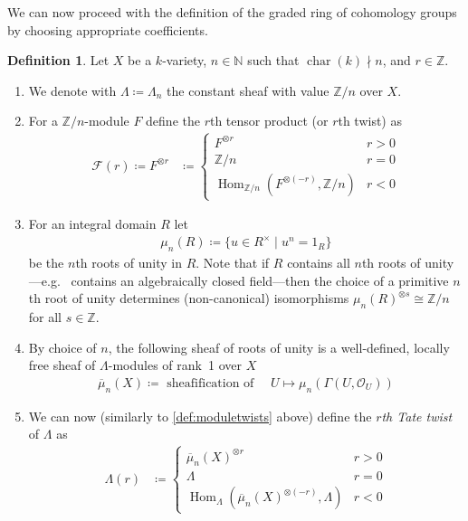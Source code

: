 \documentclass[english,headsepline=0.25pt]{scrartcl}
\theoremstyle{definition}
\newtheorem{Def}{Definition}[section]
\theoremstyle{remark}
\newcommand*{\N}{\mathds{N}}
\newcommand*{\Z}{\mathds{Z}}
\newcommand*{\Zmod}[1]{\Z/#1} %
\newcommand*{\F}{\mathcal{F}} %
\DeclareMathOperator{\Char}{char} %
\DeclareMathOperator{\Hom}{Hom} %
\newcommand*{\forexample}{e.g.\ }
\begin{document}
We can now proceed with the definition of the graded ring of
cohomology groups by choosing appropriate coefficients.
\begin{Def}\label{def:coefficients}
  Let $X$ be a $k$-variety,
  $n\in\N$ such that $\Char(k)\nmid n$,
  and $r\in\Z$.
  \begin{enumerate}
  \item We denote with $\Lambda\coloneqq\Lambda_n$ the constant sheaf
    with value $\Zmod{n}$ over $X$.
  \item\label{def:moduletwists}
    For a $\Zmod{n}$-module $F$ define the $r$th tensor product
    (or $r$th twist) as
    \begin{align*}
      \F(r)\coloneqq F^{\otimes r}
      &\coloneqq \begin{cases}
        F^{\otimes r} &r>0\\
        \Zmod{n} &r=0\\
        \Hom_{\Zmod{n}}(F^{\otimes (-r)},\Zmod{n}) &r<0
      \end{cases}
    \end{align*}
  \item\label{def:rootsofunity} For an integral domain $R$ let
    \begin{gather*}
      \mu_n(R)\coloneqq\{ u\in R^\times\;|\;u^n=1_R\}
    \end{gather*}
    be the $n$th roots of unity in $R$. 
    Note that if $R$ contains all $n$th roots of unity---\forexample
    contains an algebraically closed field---then the choice of a
    primitive $n$th root of unity determines (non-canonical) isomorphisms
    $\mu_n(R)^{\otimes s}\cong\Zmod{n}$ for all $s\in\Z$.
  \item By choice of $n$, the following sheaf of roots of unity is a
    well-defined, locally free sheaf of $\Lambda$-modules of rank~1
    over $X$
    \begin{gather*}
      \overline\mu_n(X) \coloneqq \text{ sheafification of }\quad
      U\mapsto \mu_n(\Gamma(U,\mathcal O_U))
    \end{gather*}
  \item\label{def:tatetwist}
    We can now (similarly to \ref{def:moduletwists} above) define the
    \emph{$r$th Tate twist} of $\Lambda$ as
    \begin{align*}
      \Lambda(r) &\coloneqq \begin{cases}
        \overline\mu_n(X)^{\otimes r} &r>0\\
        \Lambda &r=0\\
        \Hom_{\Lambda}(\overline\mu_n(X)^{\otimes (-r)},\Lambda) &r<0

\end{cases}
\end{align*}
\end{enumerate}
\end{Def}
\end{document}
